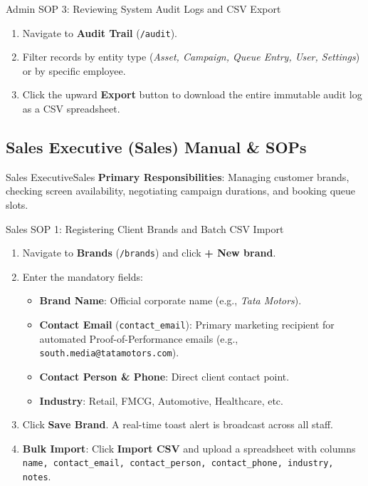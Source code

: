 \documentclass[11pt,a4paper]{article}
\begin{document}
\begin{sopbox}{Admin SOP 3: Reviewing System Audit Logs and CSV Export}
\begin{enumerate}[leftmargin=1.2em, itemsep=2pt]
    \item Navigate to \textbf{Audit Trail} (\texttt{/audit}).
    \item Filter records by entity type (\textit{Asset, Campaign, Queue Entry, User, Settings}) or by specific employee.
    \item Click the upward \textbf{Export} button to download the entire immutable audit log as a CSV spreadsheet.
\end{enumerate}
\end{sopbox}

\newpage

\subsection{Sales Executive (Sales) Manual \& SOPs}

\begin{rolebox}{Sales Executive}{Sales}
\textbf{Primary Responsibilities}: Managing customer brands, checking screen availability, negotiating campaign durations, and booking queue slots.
\end{rolebox}

\begin{sopbox}{Sales SOP 1: Registering Client Brands and Batch CSV Import}
\begin{enumerate}[leftmargin=1.2em, itemsep=2pt]
    \item Navigate to \textbf{Brands} (\texttt{/brands}) and click \textbf{+ New brand}.
    \item Enter the mandatory fields:
    \begin{itemize}[leftmargin=1em, itemsep=2pt]
        \item \textbf{Brand Name}: Official corporate name (e.g., \textit{Tata Motors}).
        \item \textbf{Contact Email} (\texttt{contact\_email}): Primary marketing recipient for automated Proof-of-Performance emails (e.g., \texttt{south.media@tatamotors.com}).
        \item \textbf{Contact Person \& Phone}: Direct client contact point.
        \item \textbf{Industry}: Retail, FMCG, Automotive, Healthcare, etc.
    \end{itemize}
    \item Click \textbf{Save Brand}. A real-time toast alert is broadcast across all staff.
    \item \textbf{Bulk Import}: Click \textbf{Import CSV} and upload a spreadsheet with columns \texttt{name, contact\_email, contact\_person, contact\_phone, industry, notes}.
\end{enumerate}
\end{sopbox}
\end{document}
